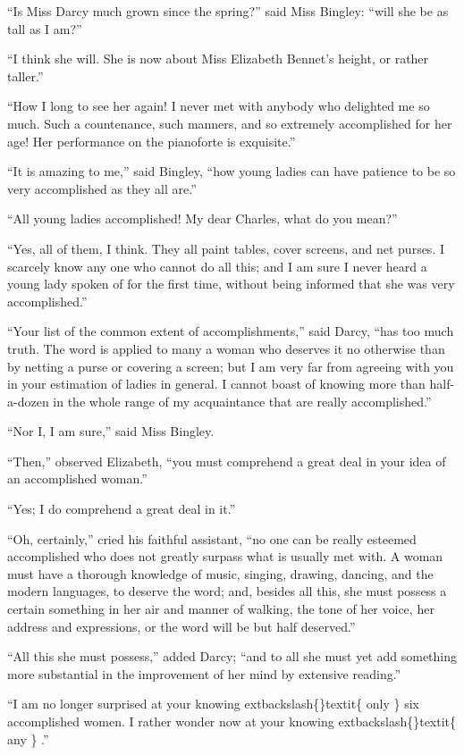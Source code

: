 \documentclass[10pt]{book}
\begin{document}
   “Is Miss Darcy much grown since the spring?” said Miss Bingley: “will
she be as tall as I am?”
  

   “I think she will. She is now about Miss Elizabeth Bennet’s height, or
rather taller.”
  

   “How I long to see her again! I never met with anybody who delighted me
so much. Such a countenance, such manners, and so extremely accomplished
for her age! Her performance on the pianoforte is exquisite.”
  

   “It is amazing to me,” said Bingley, “how young ladies can have patience
to be so very accomplished as they all are.”
  

   “All young ladies accomplished! My dear Charles, what do you mean?”
  

   “Yes, all of them, I think. They all paint tables, cover screens, and
net purses. I scarcely know any one who cannot do all this; and I am
sure I never heard a young lady spoken of for the first time, without
being informed that she was very accomplished.”
  

   “Your list of the common extent of accomplishments,” said Darcy, “has
too much truth. The word is applied to many a woman who deserves it no
otherwise than by netting a purse or covering a screen; but I am very
far
   from agreeing with you in your estimation of ladies in general. I
cannot boast of knowing more than half-a-dozen in the whole range of my
acquaintance that are really accomplished.”
  

   “Nor I, I am sure,” said Miss Bingley.
  

   “Then,” observed Elizabeth, “you must comprehend a great deal in your
idea of an accomplished woman.”
  

   “Yes; I do comprehend a great deal in it.”
  

   “Oh, certainly,” cried his faithful assistant, “no one can be really
esteemed accomplished who does not greatly surpass what is usually met
with. A woman must have a thorough knowledge of music, singing, drawing,
dancing, and the modern languages, to deserve the word; and, besides all
this, she must possess a certain something in her air and manner of
walking, the tone of her voice, her address and expressions, or the word
will be but half deserved.”
  

   “All this she must possess,” added Darcy; “and to all she must yet add
something more substantial in the improvement of her mind by extensive
reading.”
  

   “I am no longer surprised at your knowing
   	extbackslash\{\}textit\{
    only
   \}
   six accomplished women.
I rather wonder now at your knowing
   	extbackslash\{\}textit\{
    any
   \}
   .”
  
\end{document}
